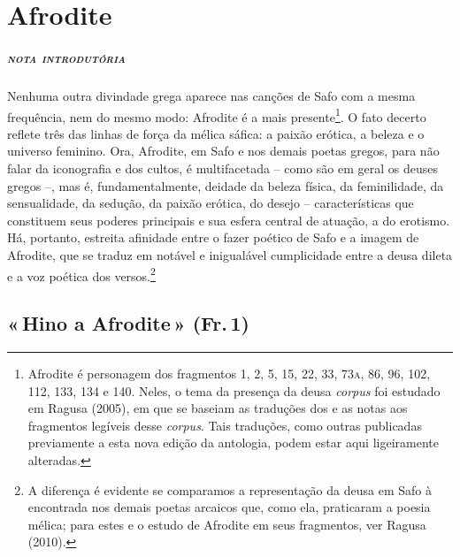 \setbeforesecskip{1.2\onelineskip}%
  \setaftersecskip{.35\onelineskip}%
  \setsecheadstyle{\large\baselineskip=.7\baselineskip\bfseries\scshape\MakeTextLowercase}%

\oneside
\pagestyle{plain}

\chapter{Afrodite}

\paragraph{\textsc{nota introdutória}} 
Nenhuma outra divindade grega aparece nas canções de Safo com a mesma
frequência, nem do mesmo modo: Afrodite é a mais presente\footnote{ Afrodite é
personagem dos fragmentos 1, 2, 5, 15, 22, 33, 73\textsc{a}, 86, 96, 102, 112, 133, 134
e 140. Neles, o tema da presença da deusa \textit{corpus} foi estudado em Ragusa (2005), em que se baseiam as traduções dos e as notas aos fragmentos legíveis desse \textit{corpus}. Tais traduções, como outras publicadas previamente a esta nova edição da antologia, podem estar aqui ligeiramente alteradas.}. O fato
decerto reflete três das linhas de força da mélica sáfica: a
paixão erótica, a beleza e o universo feminino. Ora, Afrodite, em Safo e nos
demais poetas gregos, para não falar da iconografia e dos cultos, é
multifacetada -- como são em geral os deuses gregos --, mas é, fundamentalmente,
deidade da beleza física, da feminilidade, da sensualidade, da sedução, da
paixão erótica, do desejo -- características que constituem seus poderes
principais e sua esfera central de atuação, a do erotismo. Há, portanto,
estreita afinidade entre o fazer poético de Safo e a imagem de Afrodite, que se
traduz em notável e inigualável cumplicidade entre a deusa dileta e a voz
poética dos versos.\footnote{ A diferença é evidente se comparamos a
representação da deusa em Safo à encontrada nos demais poetas arcaicos que, como ela, praticaram a poesia mélica; para estes e o estudo de Afrodite em seus fragmentos, ver Ragusa (2010).}

\pagebreak
\section{«\,Hino a Afrodite\,» (Fr.\,1)} 

